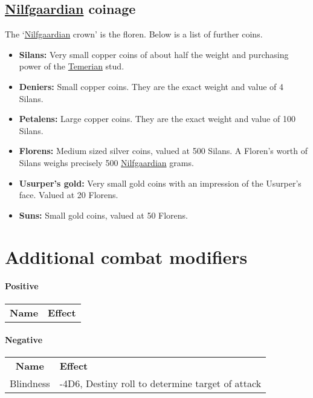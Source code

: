 \documentclass[parskip=full,11pt]{scrreport}
\begin{document}
\section{\hyperref[realm:nilfgaard]{Nilfgaardian} coinage}
The `\hyperref[realm:nilfgaard]{Nilfgaardian} crown' is the floren. Below is a list of further coins.

\begin{itemize}
	\item \textbf{Silans:} Very small copper coins of about half the weight and purchasing power of the \hyperref[realm:temeria]{Temerian}
		  stud. 
	\item \textbf{Deniers:} Small copper coins. They are the exact weight and value of 4 Silans.
	\item \textbf{Petalens:} Large copper coins. They are the exact weight and value of 100 Silans.
	\item \textbf{Florens:} Medium sized silver coins, valued at 500 Silans. A Floren's worth of Silans weighs
		  precisely 500 \hyperref[realm:nilfgaard]{Nilfgaardian} grams.
	\item \textbf{Usurper's gold:} Very small gold coins with an impression of the Usurper's face. Valued at 20 Florens.
	\item \textbf{Suns:} Small gold coins, valued at 50 Florens.
\end{itemize}

\chapter{Additional combat modifiers}

\large

\subsubsection*{Positive}

\begin{tabular}{cl}
	\rowcolor{tablebackgroundposhead}
	\textbf{Name} & \textbf{Effect} \\
\end{tabular}


\subsubsection*{Negative}

\begin{tabular}{cl}
	\rowcolor{tablebackgroundneghead}
	\textbf{Name}                       & \textbf{Effect}                                  \\
	Blindness\label{modifier:blindness} & -4D6, Destiny roll to determine target of attack \\
\end{tabular}
\end{document}
